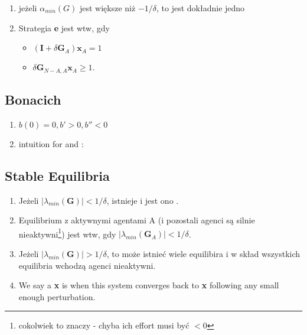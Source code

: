 \documentclass{article}
\newcommand\wassterm[1]{{\color{blue}{#1}}}
\begin{document}
\begin{enumerate}
  \item
    jeżeli $\alpha_{min}(G)$ jest większe niż $-1/\delta$, to jest dokładnie jedno
    \wassterm{Nash equilibrium}
  \item Strategia \textbf{e} jest \wassterm{Nash equilibrium} wtw, gdy 
  	\begin{itemize}
	  \item $ (\textbf{I} + \delta \textbf{G}_{A})\textbf{x}_{A} = 1$
  	  \item $ \delta\textbf{G}_{N-A,A}\textbf{x}_A \geq 1.$
  	\end{itemize}
\end{enumerate}

\subsection{Bonacich}


\begin{enumerate}
  \item
    \wassterm{benefit function}
    $
    b(0) = 0, 
    b' > 0,
    b'' < 0
    $

  \item
    intuition for 
    \wassterm{positive externalities}
    and
    \wassterm{negative eternalities}:

\end{enumerate}

\subsection{Stable Equilibria}

\begin{enumerate}
 \item Jeżeli $|\lambda_{min}(\textbf{G})| < 1/\delta$, istnieje \wassterm{unikalne Nash equilibrium} i jest ono \wassterm{stabilne}.
 \item Equilibrium z aktywnymi agentami A (i pozostali agenci są silnie nieaktywni\footnote{cokolwiek to znaczy - chyba ich effort musi być $< 0$}) jest \wassterm{stabilne} wtw, gdy  $|\lambda_{min}(\textbf{G}_{A})| < 1/\delta$.
 \item Jeżeli $|\lambda_{min}(\textbf{G})| > 1/\delta$, to może istnieć wiele equilibira i w skład wszystkich equilibria wchodzą agenci nieaktywni.
 \item We say a \wassterm{Nash equilibrium} \textbf{x} is \wassterm{asymptotically stable} when this system converges back to \textbf{x} following any small enough perturbation.
\end{enumerate}
\end{document}
